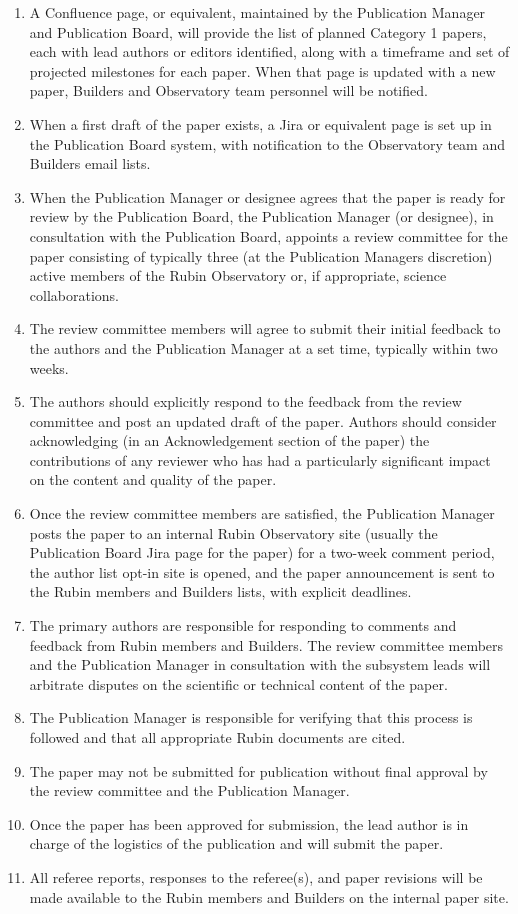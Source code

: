 \begin{enumerate}
\def\labelenumi{\arabic{enumi}.}
\item
  A Confluence page, or equivalent, maintained by the Publication Manager and Publication Board, will provide the list of planned Category 1 papers, each with lead authors or editors identified, along with a timeframe and set of projected milestones for each paper.
  When that page is updated with a new paper, Builders and Observatory team personnel will be notified.
\item
  When a first draft of the paper exists, a Jira or equivalent page is set up in the Publication Board system, with notification to the Observatory team and Builders email lists.
\item
  When the Publication Manager or designee agrees that the paper is ready for review by the Publication Board, the Publication Manager (or designee), in consultation with the Publication Board, appoints a review committee for the paper consisting of typically three (at the Publication Manager\textquotesingle s discretion) active members of the Rubin Observatory or, if appropriate, science collaborations.
\item
  The review committee members will agree to submit their initial feedback to the authors and the Publication Manager at a set time, typically within two weeks.
\item
  The authors should explicitly respond to the feedback from the review committee and post an updated draft of the paper.
  Authors should consider acknowledging (in an Acknowledgement section of the paper) the contributions of any reviewer who has had a particularly significant impact on the content and quality of the paper.
\item
  Once the review committee members are satisfied, the Publication Manager posts the paper to an internal Rubin Observatory site (usually the Publication Board Jira page for the paper) for a two-week comment period, the author list opt-in site is opened, and the paper announcement is sent to the Rubin members and Builders lists, with explicit deadlines.
\item
  The primary authors are responsible for responding to comments and feedback from Rubin members and Builders.
  The review committee members and the Publication Manager in consultation with the subsystem leads will arbitrate disputes on the scientific or technical content of the paper.
\item
  The Publication Manager is responsible for verifying that this process is followed and that all appropriate Rubin documents are cited.
\item
  The paper may not be submitted for publication without final approval by the review committee and the Publication Manager.
\item
  Once the paper has been approved for submission, the lead author is in charge of the logistics of the publication and will submit the paper.
\item
  All referee reports, responses to the referee(s), and paper revisions will be made available to the Rubin members and Builders on the internal paper site.
\end{enumerate}

